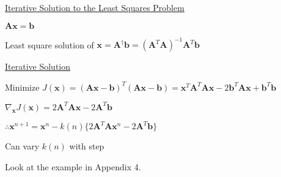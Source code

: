 \documentclass[fleqn]{article}
\begin{document}
	\underline{Iterative Solution to the Least Squares Problem}
	
	$\mathbf{Ax} = \mathbf{b}$
	
	Least square solution of $\mathbf{x} = \mathbf{A}^{\dag}\mathbf{b} = (\mathbf{A}^T\mathbf{A})^{-1}\mathbf{A}^T\mathbf{b}$
	
	\underline{Iterative Solution}
	
	Minimize $J(\mathbf{x}) = (\mathbf{Ax} - \mathbf{b})^T(\mathbf{Ax} - \mathbf{b}) = \mathbf{x}^T\mathbf{A}^T\mathbf{A}\mathbf{x} - 2\mathbf{b}^T\mathbf{Ax}+ \mathbf{b}^T\mathbf{b}$

	$\nabla_{\mathbf{x}}J(\mathbf{x}) = 2\mathbf{A}^T\mathbf{Ax} - 2\mathbf{A}^T\mathbf{b}$
	
	$\therefore \mathbf{x}^{n+1} = \mathbf{x}^n - k(n)\{2\mathbf{A}^T\mathbf{A}\mathbf{x}^{n} - 2\mathbf{A}^T\mathbf{b}\}$
	
	Can vary $k(n)$ with step
	
	Look at the example in Appendix 4.
\end{document}
